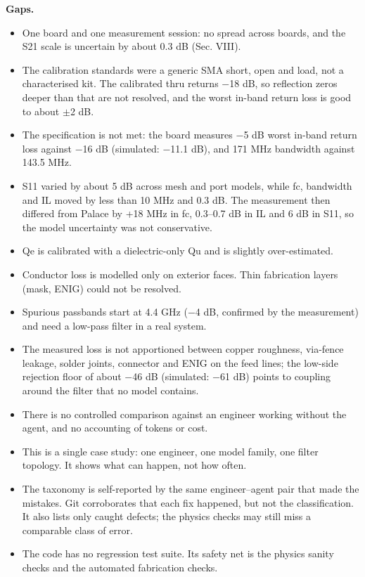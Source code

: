 \documentclass{ieeeaccess}
\begin{document}
\textbf{Gaps.}

\begin{itemize}
\item
  One board and one measurement session: no spread across boards, and the
  S21 scale is uncertain by about 0.3 dB (Sec. VIII).
\item
  The calibration standards were a generic SMA short, open and load, not a
  characterised kit. The calibrated thru returns \ensuremath{-}18 dB, so reflection zeros
  deeper than that are not resolved, and the worst in-band return loss is
  good to about \ensuremath{\pm}2 dB.
\item
  The specification is not met: the board measures \ensuremath{-}5 dB worst in-band return
  loss against \ensuremath{-}16 dB (simulated: \ensuremath{-}11.1 dB), and 171 MHz bandwidth against
  143.5 MHz.
\item
  S11 varied by about 5 dB across mesh and port models, while fc, bandwidth
  and IL moved by less than 10 MHz and 0.3 dB. The measurement then differed
  from Palace by +18 MHz in fc, 0.3--0.7 dB in IL and 6 dB in S11, so the
  model uncertainty was not conservative.
\item
  Qe is calibrated with a dielectric-only Qu and is slightly over-estimated.
\item
  Conductor loss is modelled only on exterior faces. Thin fabrication layers
  (mask, ENIG) could not be resolved.
\item
  Spurious passbands start at 4.4 GHz (\ensuremath{-}4 dB, confirmed by the measurement) and
  need a low-pass filter in a real system.
\item
  The measured loss is not apportioned between copper roughness, via-fence
  leakage, solder joints, connector and ENIG on the feed lines; the low-side rejection floor of about \ensuremath{-}46 dB
  (simulated: \ensuremath{-}61 dB) points to coupling around the filter that no model contains.
\item
  There is no controlled comparison against an engineer working without the
  agent, and no accounting of tokens or cost.
\item
  This is a single case study: one engineer, one model family, one filter
  topology. It shows what can happen, not how often.
\item
  The taxonomy is self-reported by the same engineer--agent pair that made the
  mistakes. Git corroborates that each fix happened, but not the
  classification. It also lists only caught defects; the physics checks may
  still miss a comparable class of error.
\item
  The code has no regression test suite. Its safety net is the physics
  sanity checks and the automated fabrication checks.
\end{itemize}
\end{document}
